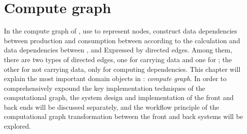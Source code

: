 \begin{savequote}[45mm]
\end{savequote}

\chapter{Compute graph} 
\label{ch:computation-graph}
\begin{content}
In the compute graph of \tf{}, use  to represent nodes, construct data dependencies between production and consumption between  according to the calculation and data dependencies between , and Expressed by directed edges. Among them, there are two types of directed edges, one for carrying data and one for ; the other for not carrying data, only for computing dependencies.
This chapter will explain the most important domain objects in \tf{}: \emph{compute graph}. In order to comprehensively expound the key implementation techniques of the computational graph, the system design and implementation of the front and back ends will be discussed separately, and the workflow principle of the computational graph transformation between the front and back systems will be explored.
\end{content}


